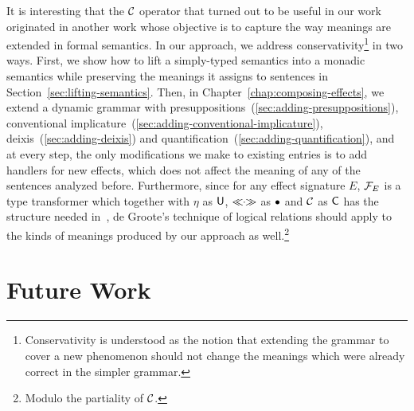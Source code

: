 It is interesting that the $\mathcal{C}$ operator that turned out to be useful in
our work originated in another work whose objective is to capture the way
meanings are extended in formal semantics. In our approach, we address
conservativity\footnote{Conservativity is understood as the notion that
  extending the grammar to cover a new phenomenon should not change the
  meanings which were already correct in the simpler grammar.} in two
ways. First, we show how to lift a simply-typed semantics into a monadic
semantics while preserving the meanings it assigns to sentences in
Section~\ref{sec:lifting-semantics}. Then, in
Chapter~\ref{chap:composing-effects}, we extend a dynamic grammar with
presuppositions~(\ref{sec:adding-presuppositions}), conventional
implicature~(\ref{sec:adding-conventional-implicature}),
deixis~(\ref{sec:adding-deixis}) and
quantification~(\ref{sec:adding-quantification}), and at every step, the
only modifications we make to existing entries is to add handlers for new
effects, which does not affect the meaning of any of the sentences analyzed
before. Furthermore, since for any effect signature $E$, $\mathcal{F}_E$ is a type
transformer which together with $\eta$ as $\textsf{U}$, $\mathbin{\ll\!\!\cdot\!\!\gg}$ as $\mathbin{\bullet}$ and
$\mathcal{C}$ as $\textsf{C}$ has the structure needed
in~\cite{degroote2015conservativity}, de Groote's technique of logical
relations should apply to the kinds of meanings produced by our approach as
well.\footnote{Modulo the partiality of $\mathcal{C}$.}


\section{Future Work}
